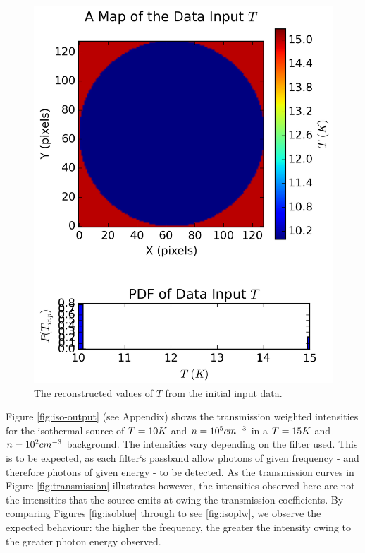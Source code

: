 \documentclass{report}
\begin{document}
\begin{figure}[H]
{\begin{minipage}[b]{0.34\linewidth}
    \includegraphics[width=\linewidth]{../img/sim/map_T_data.png}
    \caption{\protect The reconstructed values of $T$ from the initial input data.}\label{fig:map_T_data}
    \vspace{1.5ex}
  \end{minipage}}
\end{figure}

Figure \ref{fig:iso-output} (see Appendix) shows the transmission weighted intensities for the isothermal source of $T=10\/K$ and $n=10^{5}\/cm^{-3}$ in a $T=15\/K$ and $n=10^{2}\/cm^{-3}$ background. The intensities vary depending on the filter used. This is to be expected, as each filter`s passband allow photons of given frequency - and therefore photons of given energy - to be detected. As the transmission curves in Figure \ref{fig:transmission} illustrates however, the intensities observed here are not the intensities that the source emits at owing the transmission coefficients. By comparing Figures \ref{fig:isoblue} through to see \ref{fig:isoplw}, we observe the expected behaviour: the higher the frequency, the greater the intensity owing to the greater photon energy observed.
\end{document}
